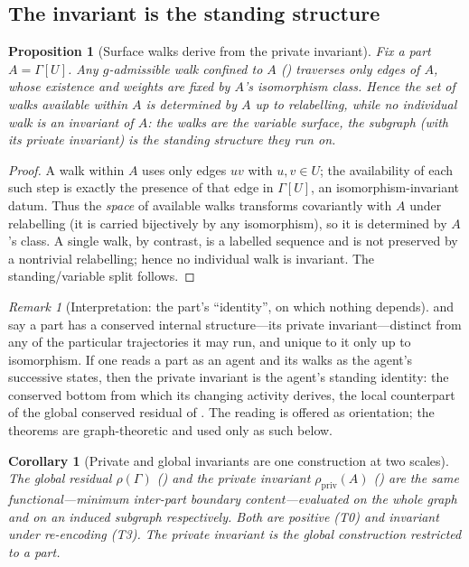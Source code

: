 \documentclass[11pt,a4paper]{article}
\theoremstyle{thmstyle}
\newtheorem{proposition}[theorem]{Proposition}
\newtheorem{corollary}[theorem]{Corollary}
\theoremstyle{definition}
\theoremstyle{remark}
\newtheorem{remark}[theorem]{Remark}
\newcommand{\Gph}{\Gamma}                 %
\newcommand{\gate}{g}                     %
\newcommand{\Agent}{A}                    %
\newcommand{\Res}{\rho}                   %
\begin{document}
\subsection{The invariant is the standing structure}

\begin{proposition}[Surface walks derive from the private invariant]
\label{prop:surface-derives}
Fix a part $\Agent=\Gph[U]$. Any $\gate$-admissible walk confined to $\Agent$
\textup{(}\textup{)} traverses only edges of $\Agent$,
whose existence and weights are fixed by $\Agent$'s isomorphism class. Hence the
set of walks available within $\Agent$ is determined by $\Agent$ up to
relabelling, while no individual walk is an invariant of $\Agent$: the walks are
the variable surface, the subgraph \textup{(}with its private invariant\textup{)}
is the standing structure they run on.
\end{proposition}

\begin{proof}
A walk within $\Agent$ uses only edges $uv$ with $u,v\in U$; the availability of
each such step is exactly the presence of that edge in $\Gph[U]$, an
isomorphism-invariant datum. Thus the \emph{space} of available walks transforms
covariantly with $\Agent$ under relabelling (it is carried bijectively by any
isomorphism), so it is determined by $\Agent$'s class. A single walk, by
contrast, is a labelled sequence and is not preserved by a nontrivial
relabelling; hence no individual walk is invariant. The standing/variable split
follows.
\end{proof}

\begin{remark}[Interpretation: the part's ``identity'', on which nothing depends]
\label{rem:character}
 and  say a part has a conserved
internal structure---its private invariant---distinct from any of the particular
trajectories it may run, and unique to it only up to isomorphism. If one reads a
part as an agent and its walks as the agent's successive states, then the private
invariant is the agent's standing identity: the conserved bottom from which its
changing activity derives, the local counterpart of the global conserved residual
of . The reading is offered as orientation; the theorems are
graph-theoretic and used only as such below.
\end{remark}

\begin{corollary}[Private and global invariants are one construction at two
scales]
\label{cor:two-scales}
The global residual $\Res(\Gph)$ \textup{(}\textup{)} and the
private invariant $\Res_{\mathrm{priv}}(\Agent)$ \textup{(}\textup{)}
are the same functional---minimum inter-part boundary content---evaluated on the
whole graph and on an induced subgraph respectively. Both are positive
\textup{(}T0\textup{)} and invariant under re-encoding \textup{(}T3\textup{)}. The
private invariant is the global construction restricted to a part.
\end{corollary}
\end{document}
